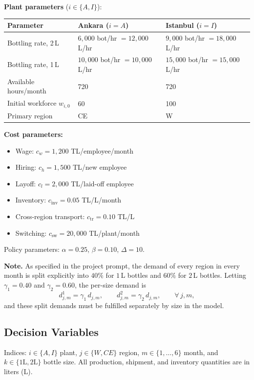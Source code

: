 \documentclass[12pt,a4paper]{article}
\begin{document}
\textbf{Plant parameters} ($i\in\{A,I\}$):

\begin{center}
\begin{tabular}{lll}
\toprule
Parameter & Ankara ($i=A$) & Istanbul ($i=I$) \\
\midrule
Bottling rate, 2\,L & $6{,}000$ bot/hr $=12{,}000$ L/hr & $9{,}000$ bot/hr $=18{,}000$ L/hr \\
Bottling rate, 1\,L & $10{,}000$ bot/hr $=10{,}000$ L/hr & $15{,}000$ bot/hr $=15{,}000$ L/hr \\
Available hours/month & 720 & 720 \\
Initial workforce $w_{i,0}$ & 60 & 100 \\
Primary region & CE & W \\
\bottomrule
\end{tabular}
\end{center}

\textbf{Cost parameters:}
\begin{itemize}
  \item Wage: $c_w=1{,}200$ TL/employee/month
  \item Hiring: $c_h=1{,}500$ TL/new employee
  \item Layoff: $c_l=2{,}000$ TL/laid-off employee
  \item Inventory: $c_{\mathrm{inv}}=0.05$ TL/L/month
  \item Cross-region transport: $c_{\mathrm{tr}}=0.10$ TL/L
  \item Switching: $c_{\mathrm{sw}}=20{,}000$ TL/plant/month
\end{itemize}

Policy parameters: $\alpha=0.25$, $\beta=0.10$, $\Delta=10$.

\textbf{Note.} As specified in the project prompt, the demand of every region in every
month is split explicitly into $40\%$ for $1\,$L bottles and $60\%$ for $2\,$L bottles.
Letting $\gamma_1=0.40$ and $\gamma_2=0.60$, the per-size demand is
\[
  d^{1}_{j,m}=\gamma_1\,d_{j,m},\qquad
  d^{2}_{j,m}=\gamma_2\,d_{j,m},\qquad \forall\,j,m,
\]
and these split demands must be fulfilled separately by size in the model.

\subsection*{Decision Variables}

Indices: $i\in\{A,I\}$ plant, $j\in\{W,CE\}$ region, $m\in\{1,\ldots,6\}$ month, and
$k\in\{1\text{L},2\text{L}\}$ bottle size. All production, shipment, and inventory
quantities are in liters (L).
\end{document}
